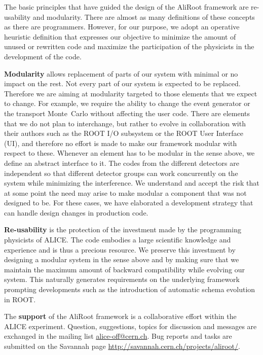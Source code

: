 \documentclass[12pt,a4paper,twoside]{article}
\makeatletter
\newcommand {\MC} {Monte~Carlo\@\xspace}
\makeatother
\begin{document}
The  basic principles  that  have  guided the  design  of the  AliRoot
framework are  re-usability and modularity.  There are almost  as many
definitions of  these concepts as there are  programmers. However, for
our purpose, we adopt an operative heuristic definition that expresses
our objective to  minimize the amount of unused  or rewritten code and
maximize the participation of the physicists in the development of the
code.

\textbf{Modularity}  allows replacement  of parts  of our  system with
minimal or  no impact  on the rest.  Not every  part of our  system is
expected  to  be  replaced.  Therefore  we are  aiming  at  modularity
targeted to those  elements that we expect to  change. For example, we
require the ability to change the event generator or the transport \MC
without affecting  the user  code. There are  elements that we  do not
plan to interchange, but rather  to evolve in collaboration with their
authors  such as the  ROOT I/O  subsystem or  the ROOT  User Interface
(UI), and  therefore no effort is  made to make  our framework modular
with respect  to these. Whenever an  element has to be  modular in the
sense above, we define an abstract interface to it. The codes from the
different detectors are independent  so that different detector groups
can   work   concurrently  on   the   system   while  minimizing   the
interference. We understand and accept the risk that at some point the
need may  arise to make modular  a component that was  not designed to
be. For  these cases, we  have elaborated a development  strategy that
can handle design changes in production code.

\textbf{Re-usability} is the protection  of the investment made by the
programming physicists of ALICE.  The code embodies a large scientific
knowledge and experience and is  thus a precious resource. We preserve
this investment by  designing a modular system in  the sense above and
by  making  sure that  we  maintain  the  maximum amount  of  backward
compatibility  while evolving  our system.   This  naturally generates
requirements on  the underlying framework  prompting developments such
as the introduction of automatic schema evolution in ROOT.

The \textbf{support} of the AliRoot framework is a collaborative effort
within  the  ALICE   experiment.  Question,  suggestions,  topics  for
discussion   and  messages   are   exchanged  in   the  mailing   list
\url{alice-off@cern.ch}. Bug  reports and  tasks are submitted  on the
Savannah page \url{http://savannah.cern.ch/projects/aliroot/}.
\end{document}
